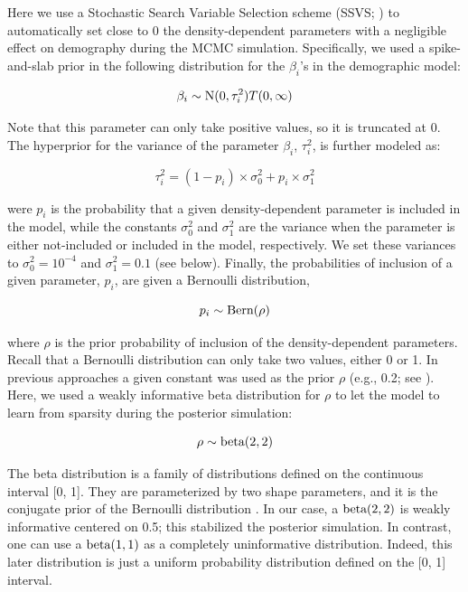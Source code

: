 \documentclass[12pt,a4paper]{article}
\begin{document}
Here we use a Stochastic Search Variable Selection scheme (SSVS; \cite{George1993}) to automatically set close to 0 the density-dependent parameters with a negligible effect on demography during the MCMC simulation. Specifically, we used a spike-and-slab prior in the following distribution for the $\beta_{i}$'s in the demographic model:

\begin{equation}\label{dd_dist}
	\beta_{i} \sim \textnormal{N}(0, \tau_{i}^2)T(0,\infty)
\end{equation}

Note that this parameter can only take positive values, so it is truncated at 0. The hyperprior for the variance of the parameter $\beta_{i}$, $\tau_{i}^2$, is further modeled as:

\begin{equation}\label{ssvs}
	\tau_{i}^2 = (1 - p_{i}) \times \sigma_{0}^2 + p_{i} \times \sigma_{1}^2
\end{equation}

were $p_{i}$ is the probability that a given density-dependent parameter is included in the model, while the constants $\sigma_{0}^2$ and $\sigma_{1}^2$ are the variance when the parameter is either not-included or included in the model, respectively. We set these variances to $\sigma_{0}^2 = 10^{-4}$ and $\sigma_{1}^2 = 0.1$ (see below). Finally, the probabilities of inclusion of a given parameter, $p_{i}$, are given a Bernoulli distribution,

\begin{equation}\label{dist_bern}
	p_{i} \sim \textnormal{Bern}(\rho)
\end{equation}

where $\rho$ is the prior probability of inclusion of the density-dependent parameters. Recall that a Bernoulli distribution can only take two values, either 0 or 1. In previous approaches a given constant was used as the prior $\rho$ (e.g., 0.2; see \cite{Almaraz2011,Mutshinda2011}). Here, we used a weakly informative beta distribution for $\rho$ to let the model to learn from sparsity during the posterior simulation:

\begin{equation}\label{dist_beta}
	\rho \sim \textnormal{beta}(2,2)
\end{equation}

The beta distribution is a family of distributions defined on the continuous interval [0, 1]. They are parameterized by two shape parameters, and it is the conjugate prior of the Bernoulli distribution \cite{Gelman2014}. In our case, a $\textnormal{beta}(2,2)$ is weakly informative centered on 0.5; this stabilized the posterior simulation. In contrast, one can use a $\textnormal{beta}(1,1)$ as a completely uninformative distribution. Indeed, this later distribution is just a uniform probability distribution defined on the [0, 1] interval.\\
\end{document}
